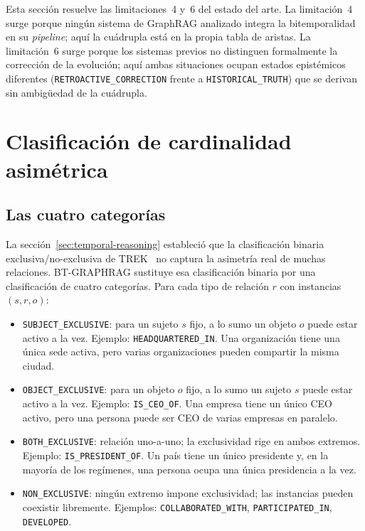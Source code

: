 Esta sección resuelve las limitaciones~4 y~6 del estado del arte. La limitación~4 surge porque ningún sistema de GraphRAG analizado integra la bitemporalidad en su \emph{pipeline}; aquí la cuádrupla está en la propia tabla de aristas. La limitación~6 surge porque los sistemas previos no distinguen formalmente la corrección de la evolución; aquí ambas situaciones ocupan estados epistémicos diferentes (\texttt{RETROACTIVE\_CORRECTION} frente a \texttt{HISTORICAL\_TRUTH}) que se derivan sin ambigüedad de la cuádrupla.

\section{Clasificación de cardinalidad asimétrica}\label{sec:bt-cardinality}

\subsection{Las cuatro categorías}

La sección~\ref{sec:temporal-reasoning} estableció que la clasificación binaria exclusiva/no-exclusiva de TREK~\cite{trek2025} no captura la asimetría real de muchas relaciones. BT-GRAPHRAG sustituye esa clasificación binaria por una clasificación de cuatro categorías. Para cada tipo de relación $r$ con instancias $(s, r, o)$:

\begin{itemize}
    \item \texttt{SUBJECT\_EXCLUSIVE}: para un sujeto $s$ fijo, a lo sumo un objeto $o$ puede estar activo a la vez. Ejemplo: \texttt{HEADQUARTERED\_IN}. Una organización tiene una única sede activa, pero varias organizaciones pueden compartir la misma ciudad.
    \item \texttt{OBJECT\_EXCLUSIVE}: para un objeto $o$ fijo, a lo sumo un sujeto $s$ puede estar activo a la vez. Ejemplo: \texttt{IS\_CEO\_OF}. Una empresa tiene un único CEO activo, pero una persona puede ser CEO de varias empresas en paralelo.
    \item \texttt{BOTH\_EXCLUSIVE}: relación uno-a-uno; la exclusividad rige en ambos extremos. Ejemplo: \texttt{IS\_PRESIDENT\_OF}. Un país tiene un único presidente y, en la mayoría de los regímenes, una persona ocupa una única presidencia a la vez.
    \item \texttt{NON\_EXCLUSIVE}: ningún extremo impone exclusividad; las instancias pueden coexistir libremente. Ejemplos: \texttt{COLLABORATED\_WITH}, \texttt{PARTICIPATED\_IN}, \texttt{DEVELOPED}.
\end{itemize}

